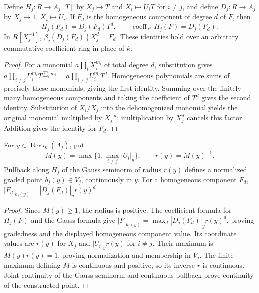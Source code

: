 \begin{lemma}
\label{charts:homogeneous-substitution}
\leanok
{}
Define $H_j:R\to A_j[T]$ by $X_j\mapsto T$ and
$X_i\mapsto U_iT$ for $i\ne j$, and define
$D_j:R\to A_j$ by $X_j\mapsto1$, $X_i\mapsto U_i$.
If $F_d$ is the homogeneous component of degree $d$ of $F$, then
\[
 H_j(F_d)=D_j(F_d)T^d,\qquad
 \operatorname{coeff}_{T^d}H_j(F)=D_j(F_d).
\]
In $R[X_j^{-1}]$,
$\beta_j(D_j(F_d))X_j^d=F_d$.
These identities hold over an arbitrary commutative coefficient ring in
place of $k$.
\end{lemma}
\begin{proof}
For a monomial $a\prod_iX_i^{m_i}$ of total degree $d$,
substitution gives
$a\prod_{i\ne j}U_i^{m_i}T^{\sum_im_i}
=a\prod_{i\ne j}U_i^{m_i}T^d$.
Homogeneous polynomials are sums of precisely these monomials, giving
the first identity. Summing over the finitely many homogeneous
components and taking the coefficient of $T^d$ gives the second identity.
Substitution of $X_i/X_j$
into the dehomogenized monomial yields the original monomial multiplied
by $X_j^{-d}$; multiplication by $X_j^d$ cancels this factor.
Addition gives the identity for $F_d$.
\end{proof}

\begin{lemma}
\label{charts:normalized-inverse}
\leanok
{}
For $y\in\operatorname{Berk}_k(A_j)$, put
\[
 M(y)=\max\{1,\max_{i\ne j}|U_i|_y\},\qquad r(y)=M(y)^{-1}.
\]
Pullback along $H_j$ of the Gauss seminorm of radius $r(y)$ defines
a normalized graded point $b_j(y)\in V_j$, continuously in $y$.
For a homogeneous component $F_d$,
$|F_d|_{b_j(y)}=|D_j(F_d)|_y r(y)^d$.
\end{lemma}
\begin{proof}
Since $M(y)\ge1$, the radius is positive. The coefficient formula
for $H_j(F)$ and the Gauss formula give
$|F|_{b_j(y)}=\max_d|D_j(F_d)|_y r(y)^d$, proving gradedness
and the displayed homogeneous component value. Its coordinate values
are $r(y)$ for $X_j$ and $|U_i|_yr(y)$ for $i\ne j$. Their maximum
is $M(y)r(y)=1$, proving normalization and membership in $V_j$.
The finite maximum defining $M$ is continuous and positive, so its
inverse $r$ is continuous. Joint continuity of the Gauss seminorm and
continuous pullback prove continuity of the constructed point.
\end{proof}

